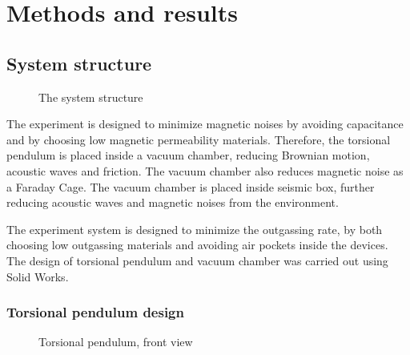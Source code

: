 \documentclass[\main/master.tex]{subfiles}
\begin{document}
\chapter{Methods and results}\label{chapter:Methods and results}

\section{System structure}
\begin{figure}[htbp]
	\centering
	\caption[Total chamber]{The system structure}
	\label{fig:Total chamber}
\end{figure}
\FloatBarrier
\par\noindent
The experiment is designed to minimize magnetic noises by avoiding capacitance and by choosing low magnetic permeability materials. Therefore, the torsional pendulum is placed inside a vacuum chamber, reducing Brownian motion, acoustic waves and friction. The vacuum chamber also reduces magnetic noise as a Faraday Cage. The vacuum chamber is placed inside seismic box, further reducing acoustic waves and magnetic noises from the environment. 

\par\noindent
The experiment system is designed to minimize the outgassing rate, by both choosing low outgassing materials and avoiding air pockets inside the devices. The design of torsional pendulum and vacuum chamber was carried out using Solid Works.

\subsection{Torsional pendulum design}
\begin{figure}[htbp]
	\centering
	\caption[Torsional pendulum, front view]{Torsional pendulum, front view}
	\label{fig:pendulum front}
\end{figure}
\FloatBarrier
\end{document}
